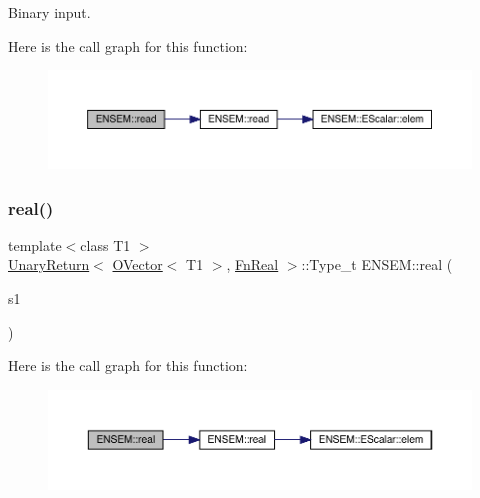 Binary input. 

Here is the call graph for this function\+:\nopagebreak
\begin{figure}[H]
\begin{center}
\leavevmode
\includegraphics[width=350pt]{da/d59/group__obsvector_ga78b51667ce539bc967764a39c77afbe0_cgraph}
\end{center}
\end{figure}
\mbox{\label{group__obsvector_ga655235d17cdd06edc03c39a79f110d59}} 
\subsubsection{\texorpdfstring{real()}{real()}}
{\footnotesize\ttfamily template$<$class T1 $>$ \\
\mbox{\hyperlink{structENSEM_1_1UnaryReturn}{Unary\+Return}}$<$ \mbox{\hyperlink{classENSEM_1_1OVector}{O\+Vector}}$<$ T1 $>$, \mbox{\hyperlink{structENSEM_1_1FnReal}{Fn\+Real}} $>$\+::Type\+\_\+t E\+N\+S\+E\+M\+::real (\begin{DoxyParamCaption}\item[{const \mbox{\hyperlink{classENSEM_1_1OVector}{O\+Vector}}$<$ T1 $>$ \&}]{s1 }\end{DoxyParamCaption})\hspace{0.3cm}{\ttfamily [inline]}}

Here is the call graph for this function\+:\nopagebreak
\begin{figure}[H]
\begin{center}
\leavevmode
\includegraphics[width=350pt]{da/d59/group__obsvector_ga655235d17cdd06edc03c39a79f110d59_cgraph}
\end{center}
\end{figure}
\mbox{\label{group__obsvector_ga0f56d530ee90cdb061c1aeff65389a61}} 
